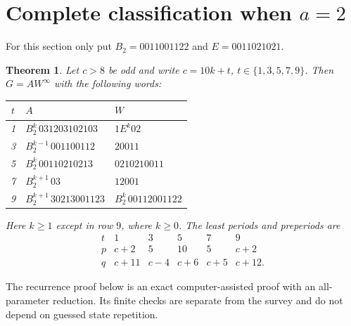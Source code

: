\documentclass[11pt]{article}
\newtheorem{theorem}{Theorem}[section]
\theoremstyle{remark}\newtheorem{remark}[theorem]{Remark}
\newcommand{\per}{^{\infty}}
\begin{document}
\section{Complete classification when \texorpdfstring{$a=2$}{a=2}}
For this section only put $B_2=0011001122$ and $E=0011021021$.
\begin{theorem}\label{thm:a2}
Let $c>8$ be odd and write $c=10k+t$, $t\in\{1,3,5,7,9\}$. Then $G=AW\per$ with the following words:
\begin{center}\small
\begin{tabular}{c|l|l}\toprule
$t$&$A$&$W$\\\midrule
1&$B_2^k\,031203102103$&$1E^k02$\\
3&$B_2^{k-1}\,001100112$&$20011$\\
5&$B_2^k\,00110210213$&$0210210011$\\
7&$B_2^{k+1}\,03$&$12001$\\
9&$B_2^{k+1}\,30213001123$&$B_2^k\,00112001122$\\\bottomrule
\end{tabular}
\end{center}
Here $k\ge1$ except in row $9$, where $k\ge0$. The least periods and preperiods are
\[
\begin{array}{c|ccccc}
t&1&3&5&7&9\\\hline
p&c+2&5&10&5&c+2\\
q&c+11&c-4&c+6&c+5&c+12.
\end{array}
\]
\end{theorem}
The recurrence proof below is an exact computer-assisted proof with an all-parameter reduction. Its finite checks are separate from the survey and do not depend on guessed state repetition.
\end{document}
